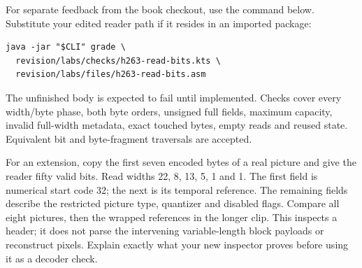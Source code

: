 For separate feedback from the book checkout, use the command below. Substitute
your edited reader path if it resides in an imported package:
\begin{Verbatim}
java -jar "$CLI" grade \
  revision/labs/checks/h263-read-bits.kts \
  revision/labs/files/h263-read-bits.asm
\end{Verbatim}
The unfinished body is expected to fail until implemented. Checks cover every
width/byte phase, both byte orders, unsigned full fields, maximum capacity,
invalid full-width metadata, exact touched bytes, empty reads and reused state.
Equivalent bit and byte-fragment traversals are accepted.

For an extension, copy the first seven encoded bytes of a real picture and give
the reader fifty valid bits. Read widths 22, 8, 13, 5, 1 and 1. The first field
is numerical start code 32; the next is its temporal reference. The remaining
fields describe the restricted picture type, quantizer and disabled flags.
Compare all eight pictures, then the wrapped references in the longer clip.
This inspects a header; it does not parse the intervening variable-length block
payloads or reconstruct pixels. Explain exactly what your new inspector proves
before using it as a decoder check.
